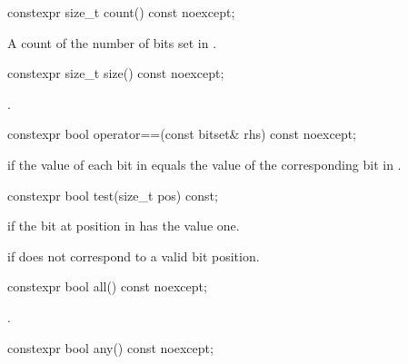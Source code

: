 %
\begin{itemdecl}
constexpr size_t count() const noexcept;
\end{itemdecl}

\begin{itemdescr}
\pnum
\returns
A count of the number of bits set in
.
\end{itemdescr}

%
\begin{itemdecl}
constexpr size_t size() const noexcept;
\end{itemdecl}

\begin{itemdescr}
\pnum
\returns
{}.
\end{itemdescr}

%
\begin{itemdecl}
constexpr bool operator==(const bitset& rhs) const noexcept;
\end{itemdecl}

\begin{itemdescr}
\pnum
\returns
{} if the value of each bit in
equals the value of the corresponding bit in .
\end{itemdescr}

%
\begin{itemdecl}
constexpr bool test(size_t pos) const;
\end{itemdecl}

\begin{itemdescr}
\pnum
\returns
{}
if the bit at position 
in
has the value one.

\pnum
\throws
{}%
 if  does not correspond to a valid bit position.
\end{itemdescr}

%
\begin{itemdecl}
constexpr bool all() const noexcept;
\end{itemdecl}

\begin{itemdescr}
\pnum
\returns
{}.
\end{itemdescr}

%
%
\begin{itemdecl}
constexpr bool any() const noexcept;
\end{itemdecl}

